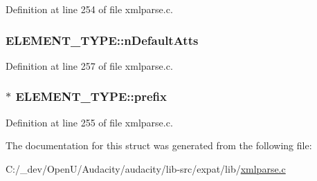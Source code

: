 Definition at line 254 of file xmlparse.\+c.

\subsubsection[{\texorpdfstring{n\+Default\+Atts}{nDefaultAtts}}]{ E\+L\+E\+M\+E\+N\+T\+\_\+\+T\+Y\+P\+E\+::n\+Default\+Atts}\hypertarget{struct_e_l_e_m_e_n_t___t_y_p_e_a258032c83d58695d5f8562a6f676cd71}{}\label{struct_e_l_e_m_e_n_t___t_y_p_e_a258032c83d58695d5f8562a6f676cd71}


Definition at line 257 of file xmlparse.\+c.

\subsubsection[{\texorpdfstring{prefix}{prefix}}]{$\ast$ E\+L\+E\+M\+E\+N\+T\+\_\+\+T\+Y\+P\+E\+::prefix}\hypertarget{struct_e_l_e_m_e_n_t___t_y_p_e_add87dda9402834586807f57625601afa}{}\label{struct_e_l_e_m_e_n_t___t_y_p_e_add87dda9402834586807f57625601afa}


Definition at line 255 of file xmlparse.\+c.



The documentation for this struct was generated from the following file\+:\begin{DoxyCompactItemize}
\item 
C\+:/\+\_\+dev/\+Open\+U/\+Audacity/audacity/lib-\/src/expat/lib/\hyperlink{xmlparse_8c}{xmlparse.\+c}\end{DoxyCompactItemize}

